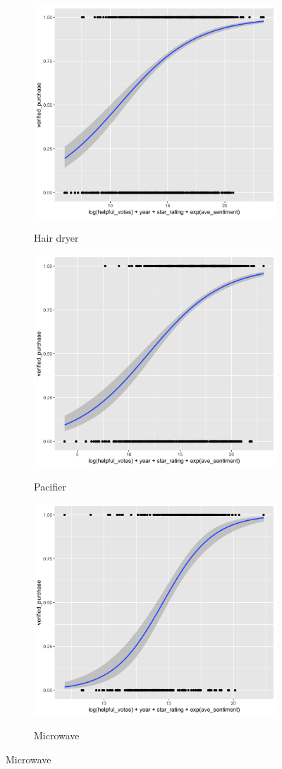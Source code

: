 \documentclass[reqno]{article}
\theoremstyle{definition}
\theoremstyle{definition}
\theoremstyle{remark}
\begin{document}
\begin{figure}[htbp]
\caption{Logistic regression model for 3 products:}
\begin{subfigure}{\textwidth}
\begin{center}
    \includegraphics[width= .5\linewidth]{hair_dryer_lg.png}
    \label{fig:sfig1}
    \caption{Hair dryer}
\end{center}
\end{subfigure}
\begin{subfigure}{\textwidth}
\begin{center}
    \includegraphics[width= .5\linewidth]{pacifier_lg.png}
    \label{fig:sfig2}
    \caption{Pacifier}
\end{center}
\end{subfigure}
\begin{subfigure}{\textwidth}
\begin{center}
    \includegraphics[width= .5\linewidth]{microwave_lg.png}
    \label{fig:sfig3}
    \caption{Microwave}
    \end{center}
\end{subfigure}
\end{figure}
\end{document}
